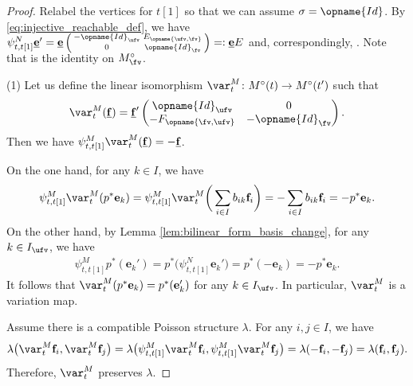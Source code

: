 \documentclass[pdftex]{sigma}
\newcommand{\Mc}{M^\circ}
\newcommand{\Iufv}{I_{\ufv}}
\newcommand{\Id}{{\opname{Id}}}
\newcommand{\ee}{\mathbf{e}}
\newcommand{\ff}{\mathbf{f}}
\newcommand{\uee}{\underline{\ee}}
\newcommand{\uff}{\underline{\ff}}
\newcommand{\high}{\opname{\ufv,\fv}}
\newcommand{\low}{\opname{\fv,\ufv}}
\numberwithin{equation}{section}
\begin{document}
\begin{proof}

Relabel the vertices for $t[1]$ so that we can assume $\sigma=\Id$.
By \eqref{eq:injective_reachable_def}, we have $\smash{\psi_{t,t[1]}^{N}\uee'}=\allowbreak\smash{\uee\left(\begin{smallmatrix}
-\Id_{\ufv} & E_{\high}\\
0 & \Id_{\fv}
\end{smallmatrix}\right)=:\uee E}$ and, correspondingly, \smash{$\psi^M_{t,t[1]}\uff'=\uff\left(\begin{smallmatrix}
-\Id_{\ufv}&0\\
F_{\low} & \Id_{\fv}
\end{smallmatrix}\right)=:\uff F$}. Note that  is the identity on $\Mc_{\fv}$.

(1) Let us define the linear isomorphism $\var_{t}^{M}\colon\Mc(t)\rightarrow\Mc(t')$
such that
\begin{align*}
\var_{t}^{M}(\uff)=\uff'\begin{pmatrix}
\Id_{\ufv}&0\\
-F_{\low} & -\Id_{\fv}
\end{pmatrix}.
\end{align*}
Then we have $\psi_{t,t[1]}^{M}\var_{t}^{M}(\uff)=-\uff$.

On the one hand, for any $k\in I$, we have
\begin{gather*}
\psi_{t,t[1]}^{M}\var_{t}^{M}(p^{*}\ee_{k}) = \psi_{t,t[1]}^{M}\var_{t}^{M}\bigg(\sum_{i\in I}b_{ik}\ff_{i}\bigg) = -\sum_{i\in I}b_{ik}\ff_{i}= -p^{*}\ee_{k}.
\end{gather*}
On the other hand, by Lemma \ref{lem:bilinear_form_basis_change},
for any $k\in\Iufv$, we have
\begin{gather*}
\psi_{t,t[1]}^{M}p^{*}(\ee_{k}') = p^{*}\big(\psi_{t,t[1]}^{N}\ee_{k}'\big) = p^{*}(-\ee_{k}) = -p^{*}\ee_{k}.
\end{gather*}
It follows that $\var_{t}^{M}(p^{*}\ee_{k})=p^{*}(\ee_{k}')$ for
any $k\in\Iufv$. In particular, $\var_{t}^{M}$ is a variation map.

Assume there is a compatible Poisson structure $\lambda$. For any $i,j\in I$, we have
\begin{gather*}
\lambda\bigl(\var_{t}^{M}\ff_{i},\var_{t}^{M}\ff_{j}\bigr) = \lambda\big(\psi_{t,t[1]}^{M}\var_{t}^{M}\ff_{i},\psi_{t,t[1]}^{M}\var_{t}^{M}\ff_{j}\big)= \lambda(-\ff_{i},-\ff_{j}) = \lambda(\ff_{i},\ff_{j}).
\end{gather*}
Therefore, $\var_{t}^{M}$ preserves $\lambda$.


\end{proof}
\end{document}
